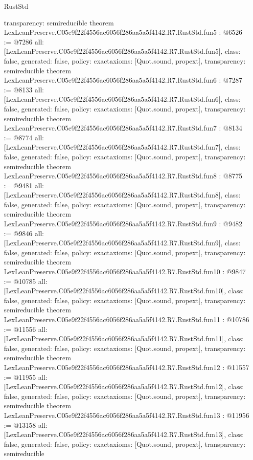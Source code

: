 \begin{lexlean}{RustStd}
\begin{coremodule}
{  transparency: semireducible
}
theorem LexLeanPreserve.C05e9f22f4556ac6056f286aa5a5f4142.R7.RustStd.fun5 : @6526 := @7286 {
  all: [LexLeanPreserve.C05e9f22f4556ac6056f286aa5a5f4142.R7.RustStd.fun5],
  class: false,
  generated: false,
  policy: exact{axioms: [Quot.sound, propext]},
  transparency: semireducible
}
theorem LexLeanPreserve.C05e9f22f4556ac6056f286aa5a5f4142.R7.RustStd.fun6 : @7287 := @8133 {
  all: [LexLeanPreserve.C05e9f22f4556ac6056f286aa5a5f4142.R7.RustStd.fun6],
  class: false,
  generated: false,
  policy: exact{axioms: [Quot.sound, propext]},
  transparency: semireducible
}
theorem LexLeanPreserve.C05e9f22f4556ac6056f286aa5a5f4142.R7.RustStd.fun7 : @8134 := @8774 {
  all: [LexLeanPreserve.C05e9f22f4556ac6056f286aa5a5f4142.R7.RustStd.fun7],
  class: false,
  generated: false,
  policy: exact{axioms: [Quot.sound, propext]},
  transparency: semireducible
}
theorem LexLeanPreserve.C05e9f22f4556ac6056f286aa5a5f4142.R7.RustStd.fun8 : @8775 := @9481 {
  all: [LexLeanPreserve.C05e9f22f4556ac6056f286aa5a5f4142.R7.RustStd.fun8],
  class: false,
  generated: false,
  policy: exact{axioms: [Quot.sound, propext]},
  transparency: semireducible
}
theorem LexLeanPreserve.C05e9f22f4556ac6056f286aa5a5f4142.R7.RustStd.fun9 : @9482 := @9846 {
  all: [LexLeanPreserve.C05e9f22f4556ac6056f286aa5a5f4142.R7.RustStd.fun9],
  class: false,
  generated: false,
  policy: exact{axioms: [Quot.sound, propext]},
  transparency: semireducible
}
theorem LexLeanPreserve.C05e9f22f4556ac6056f286aa5a5f4142.R7.RustStd.fun10 : @9847 := @10785 {
  all: [LexLeanPreserve.C05e9f22f4556ac6056f286aa5a5f4142.R7.RustStd.fun10],
  class: false,
  generated: false,
  policy: exact{axioms: [Quot.sound, propext]},
  transparency: semireducible
}
theorem LexLeanPreserve.C05e9f22f4556ac6056f286aa5a5f4142.R7.RustStd.fun11 : @10786 := @11556 {
  all: [LexLeanPreserve.C05e9f22f4556ac6056f286aa5a5f4142.R7.RustStd.fun11],
  class: false,
  generated: false,
  policy: exact{axioms: [Quot.sound, propext]},
  transparency: semireducible
}
theorem LexLeanPreserve.C05e9f22f4556ac6056f286aa5a5f4142.R7.RustStd.fun12 : @11557 := @11955 {
  all: [LexLeanPreserve.C05e9f22f4556ac6056f286aa5a5f4142.R7.RustStd.fun12],
  class: false,
  generated: false,
  policy: exact{axioms: [Quot.sound, propext]},
  transparency: semireducible
}
theorem LexLeanPreserve.C05e9f22f4556ac6056f286aa5a5f4142.R7.RustStd.fun13 : @11956 := @13158 {
  all: [LexLeanPreserve.C05e9f22f4556ac6056f286aa5a5f4142.R7.RustStd.fun13],
  class: false,
  generated: false,
  policy: exact{axioms: [Quot.sound, propext]},
  transparency: semireducible
}
\end{coremodule}
\end{lexlean}
